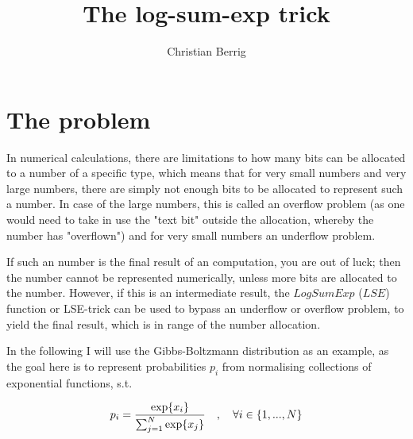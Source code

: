 \documentclass{article}
\author{Christian Berrig}
\title{The log-sum-exp trick}
\begin{document}

\maketitle



\section{The problem} 
In numerical calculations, there are limitations to how many bits can be allocated to a number of a specific type, which means that for very small numbers and very large numbers, there are simply not enough bits to be allocated to represent such a number. 
In case of the large numbers, this is called an overflow problem (as one would need to take in use the "text bit" outside the allocation, whereby the number has "overflown") and for very small numbers an underflow problem.

If such an number is the final result of an computation, you are out of luck; then the number cannot be represented numerically, unless more bits are allocated to the number. 
However, if this is an intermediate result, the $LogSumExp$ ($LSE$) function or LSE-trick can be used to bypass an underflow or overflow problem, to yield the final result, which is in range of the number allocation.

In the following I will use the Gibbs-Boltzmann distribution as an example, as the goal here is to represent probabilities $p_{i}$ from normalising collections of exponential functions, s.t.

\begin{align*}
	p_{i} = \frac{\exp{x_{i}}}{\sum_{j=1}^{N} \exp{x_{j}}} \quad , \quad \forall i \in \qty{1, ... , N}
\end{align*}
\end{document}
